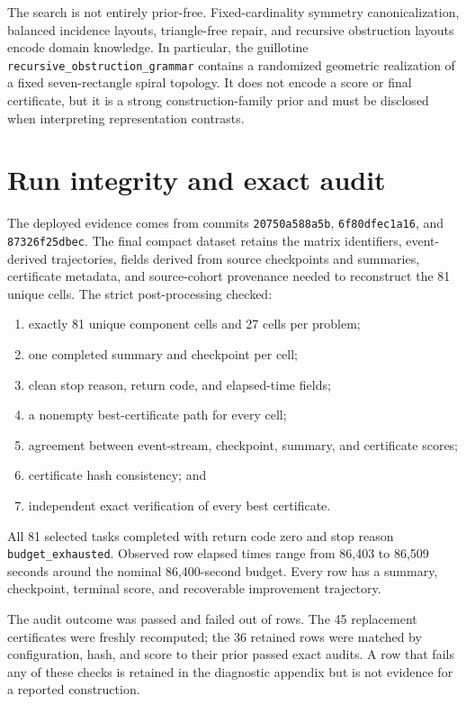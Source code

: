 \documentclass[11pt]{article}
\newcommand{\code}[1]{\texttt{#1}}
\begin{document}
The search is not entirely prior-free.  Fixed-cardinality symmetry
canonicalization, balanced incidence layouts, triangle-free repair, and
recursive obstruction layouts encode domain knowledge.  In particular, the guillotine
\code{recursive\_obstruction\_grammar} contains a randomized geometric
realization of a fixed seven-rectangle spiral topology.  It does not encode a
score or final certificate, but it is a strong construction-family prior and
must be disclosed when interpreting representation contrasts.

\section{Run integrity and exact audit}

The deployed evidence comes from commits \code{20750a588a5b},
\code{6f80dfec1a16}, and \code{87326f25dbec}.  The final compact dataset
retains the matrix identifiers, event-derived trajectories, fields derived
from source checkpoints and summaries, certificate metadata, and
source-cohort provenance needed to reconstruct the 81 unique cells.  The
strict post-processing checked:

\begin{enumerate}
\item exactly 81 unique component cells and 27 cells per problem;
\item one completed summary and checkpoint per cell;
\item clean stop reason, return code, and elapsed-time fields;
\item a nonempty best-certificate path for every cell;
\item agreement between event-stream, checkpoint, summary, and certificate
scores;
\item certificate hash consistency; and
\item independent exact verification of every best certificate.
\end{enumerate}

All 81 selected tasks completed with return code zero and stop reason
\code{budget\_exhausted}.  Observed row elapsed times range from 86,403 to
86,509 seconds around the nominal 86,400-second budget.  Every row has a
summary, checkpoint, terminal score, and recoverable improvement trajectory.

The audit outcome was \AuditPassed{} passed and \AuditFailed{} failed out of
\AuditTotal{} rows.  The 45 replacement certificates were freshly recomputed;
the 36 retained rows were matched by configuration, hash, and score to their
prior passed exact audits.  A row that fails any of these checks is retained
in the diagnostic appendix but is not evidence for a reported construction.
\end{document}
